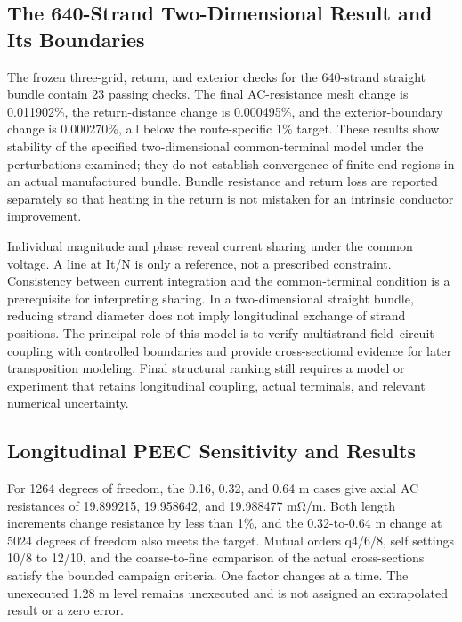 \documentclass[11pt]{article}
\begin{document}
\subsection*{The 640-Strand Two-Dimensional Result and Its Boundaries}
\hypertarget{03.coax_results.heading}{}
The frozen three-grid, return, and exterior checks for the 640-strand straight bundle contain 23 passing checks. The final AC-resistance mesh change is 0.011902\%, the return-distance change is 0.000495\%, and the exterior-boundary change is 0.000270\%, all below the route-specific 1\% target. These results show stability of the specified two-dimensional common-terminal model under the perturbations examined; they do not establish convergence of finite end regions in an actual manufactured bundle. Bundle resistance and return loss are reported separately so that heating in the return is not mistaken for an intrinsic conductor improvement.


Individual magnitude and phase reveal current sharing under the common voltage. A line at It/N is only a reference, not a prescribed constraint. Consistency between current integration and the common-terminal condition is a prerequisite for interpreting sharing. In a two-dimensional straight bundle, reducing strand diameter does not imply longitudinal exchange of strand positions. The principal role of this model is to verify multistrand field–circuit coupling with controlled boundaries and provide cross-sectional evidence for later transposition modeling. Final structural ranking still requires a model or experiment that retains longitudinal coupling, actual terminals, and relevant numerical uncertainty.


\subsection*{Longitudinal PEEC Sensitivity and Results}
\hypertarget{03.peec_results.heading}{}
For 1264 degrees of freedom, the 0.16, 0.32, and 0.64 m cases give axial AC resistances of 19.899215, 19.958642, and 19.988477 mΩ/m. Both length increments change resistance by less than 1\%, and the 0.32-to-0.64 m change at 5024 degrees of freedom also meets the target. Mutual orders q4/6/8, self settings 10/8 to 12/10, and the coarse-to-fine comparison of the actual cross-sections satisfy the bounded campaign criteria. One factor changes at a time. The unexecuted 1.28 m level remains unexecuted and is not assigned an extrapolated result or a zero error.
\end{document}
